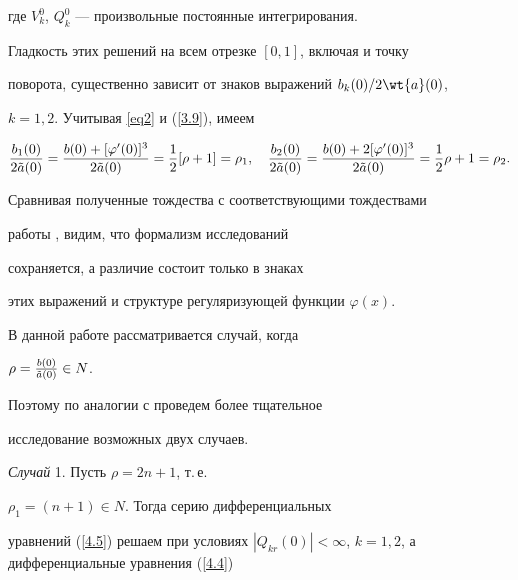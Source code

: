где $ V_k^{0}$, $ Q_k^{0}$ --- произвольные постоянные интегрирования. 


Гладкость этих решений на всем отрезке $[0,1]$, включая и точку


поворота, существенно зависит от знаков выражений ${b_k(0)}/{2 \wt{a} (0)}$,


$ k = 1,2$. Учитывая \eqref{eq2} и (\ref{3.9}), имеем


$$


\frac{ b_1 (0)}{2 \Tilde{a } (0)} =


\frac{ b (0) + [\varphi '(0)]^3} {2 \Tilde{a} (0)}


= \frac{1}{2} [ \rho + 1] = \rho_1 , \quad


\frac{ b_2 (0)}{2 \Tilde{a } (0)}


= \frac{ b (0) + 2[\varphi '(0)]^3}{2 \Tilde{a} (0)}


= \frac{1}{2} \rho + 1 = \rho_2.


$$








\begin{note}


Сравнивая полученные тождества с соответствующими тождествами


работы \cite{Bobochko2}, видим, что формализм исследований


сохраняется, а различие состоит только в знаках


этих выражений и структуре регуляризующей функции $\varphi(x)$.


\end{note}





В данной работе рассматривается случай, когда


$\rho=\frac{b(0)}{\Tilde a(0)}\in N$.


Поэтому по аналогии с \cite{Bobochko2} проведем более тщательное


исследование возможных двух случаев.


\medskip





{\it Случай} 1. Пусть $\rho = 2n + 1$, т.\,е.


$\rho_1 =(n + 1) \in N$. Тогда серию дифференциальных


уравнений (\ref{4.5}) решаем при условиях $|Q_{kr} (0)|<


\infty$, $ k = 1,2$, а дифференциальные уравнения (\ref{4.4})


